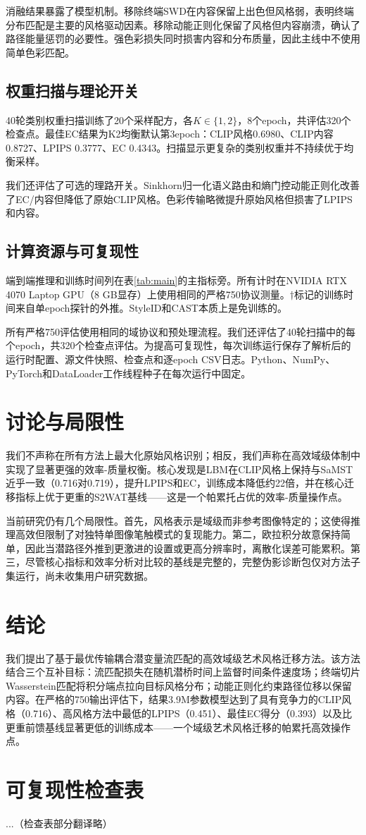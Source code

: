 ﻿\documentclass[letterpaper]{article}
\begin{document}
消融结果暴露了模型机制。移除终端SWD在内容保留上出色但风格弱，表明终端分布匹配是主要的风格驱动因素。移除动能正则化保留了风格但内容崩溃，确认了路径能量惩罚的必要性。强色彩损失同时损害内容和分布质量，因此主线中不使用简单色彩匹配。

\subsection{权重扫描与理论开关}
40轮类别权重扫描训练了20个采样配方，各$K\in\{1,2\}$，8个epoch，共评估320个检查点。最佳EC结果为K2均衡默认第3epoch：CLIP风格0.6980、CLIP内容0.8727、LPIPS 0.3777、EC 0.4343。扫描显示更复杂的类别权重并不持续优于均衡采样。

我们还评估了可选的理路开关。Sinkhorn归一化语义路由和熵门控动能正则化改善了EC/内容但降低了原始CLIP风格。色彩传输略微提升原始风格但损害了LPIPS和内容。

\subsection{计算资源与可复现性}
端到端推理和训练时间列在表\ref{tab:main}的主指标旁。所有计时在NVIDIA RTX 4070 Laptop GPU（8 GB显存）上使用相同的严格750协议测量。$\dagger$标记的训练时间来自单epoch探针的外推。StyleID和CAST本质上是免训练的。

所有严格750评估使用相同的域协议和预处理流程。我们还评估了40轮扫描中的每个epoch，共320个检查点评估。为提高可复现性，每次训练运行保存了解析后的运行时配置、源文件快照、检查点和逐epoch CSV日志。Python、NumPy、PyTorch和DataLoader工作线程种子在每次运行中固定。

\section{讨论与局限性}
我们不声称在所有方法上最大化原始风格识别；相反，我们声称在高效域级体制中实现了显著更强的效率-质量权衡。核心发现是LBM在CLIP风格上保持与SaMST近乎一致（0.716对0.719），提升LPIPS和EC，训练成本降低约22倍，并在核心迁移指标上优于更重的S2WAT基线——这是一个帕累托占优的效率-质量操作点。

当前研究仍有几个局限性。首先，风格表示是域级而非参考图像特定的；这使得推理高效但限制了对独特单图像笔触模式的复现能力。第二，欧拉积分故意保持简单，因此当潜路径外推到更激进的设置或更高分辨率时，离散化误差可能累积。第三，尽管核心指标和效率分析对比较的基线是完整的，完整伪影诊断包仅对方法子集运行，尚未收集用户研究数据。

\section{结论}
我们提出了基于最优传输耦合潜变量流匹配的高效域级艺术风格迁移方法。该方法结合三个互补目标：流匹配损失在随机潜桥时间上监督时间条件速度场；终端切片Wasserstein匹配将积分端点拉向目标风格分布；动能正则化约束路径位移以保留内容。在严格的750输出评估下，结果3.9M参数模型达到了具有竞争力的CLIP风格（0.716）、高风格方法中最低的LPIPS（0.451）、最佳EC得分（0.393）以及比更重前馈基线显著更低的训练成本——一个域级艺术风格迁移的帕累托高效操作点。

\FloatBarrier


\clearpage
\small
\setlength{\itemsep}{1pt}
\setlength{\parskip}{2pt}
\section*{可复现性检查表}
...（检查表部分翻译略）
\end{document}
